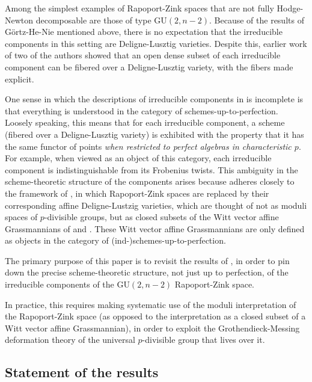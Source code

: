 \documentclass[11pt]{alggeom}
\begin{document}
Among the simplest examples of Rapoport-Zink spaces that are not fully Hodge-Newton decomposable are those of type  $\mathrm{GU}(2,n-2)$.  Because of the results of  G\"{o}rtz-He-Nie mentioned above, there is no expectation that the irreducible components in this setting are Deligne-Lusztig varieties.
Despite this,  earlier work of two of the authors  \cite{FI}  showed that an open dense subset of each irreducible component can be fibered  over a Deligne-Lusztig variety, with the fibers made explicit.

One sense in which the descriptions of irreducible components  in \cite{FI} is incomplete is that everything is understood  in the  category of schemes-up-to-perfection.  
Loosely speaking, this means that for each irreducible component, a scheme (fibered over a Deligne-Lusztig variety) is exhibited with the property that it has the same functor of points \emph{when restricted to perfect algebras in characteristic $p$}.  For example, when viewed as an object of this category, each irreducible component is   indistinguishable  from its Frobenius twists.  
This ambiguity in the scheme-theoretic structure of the components arises because \cite{FI} adheres closely to the framework of \cite{XZ}, in which Rapoport-Zink spaces are replaced by their corresponding affine Deligne-Lustzig varieties, which are thought of not as moduli spaces of  $p$-divisible groups, but as closed subsets  of  the  Witt vector affine Grassmannians of \cite{Zhu} and \cite{BhattScholze}.
  These  Witt vector affine Grassmannians
are only defined as objects in the category of (ind-)schemes-up-to-perfection.

The primary purpose of this paper is to revisit the results of \cite{FI}, in order to pin down the precise scheme-theoretic structure,  not just up to perfection, of the irreducible components of the  $\mathrm{GU}(2,n-2)$ Rapoport-Zink space.   

In practice, this requires making  systematic use of  the moduli interpretation  of the Rapoport-Zink space (as opposed to the interpretation as a closed subset of a Witt vector affine Grassmannian), in order to exploit the Grothendieck-Messing deformation theory of the universal $p$-divisible group that lives over it.





\subsection{Statement of the results}
\end{document}

